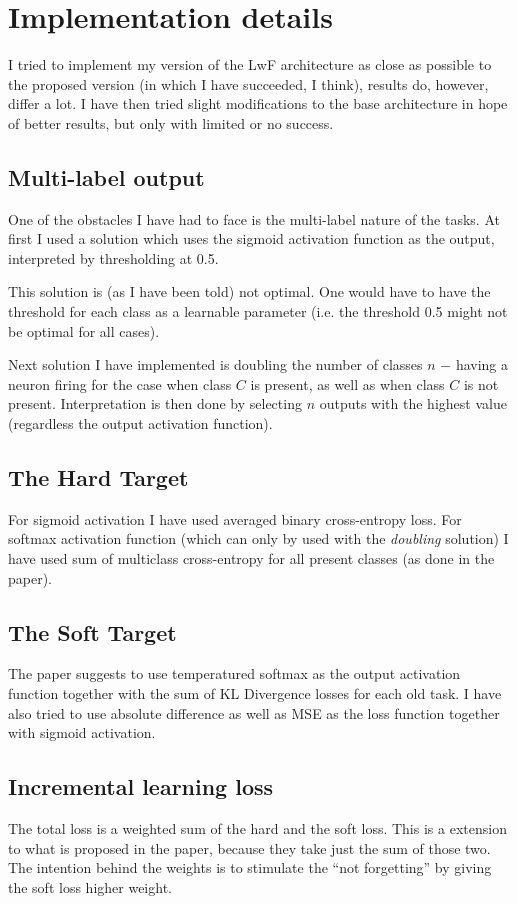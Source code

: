\documentclass[a4paper,twocolumn]{article}
\begin{document}
\section{Implementation details}
I tried to implement my version of the LwF
architecture as close as possible to the proposed version (in which I have
succeeded, I think), results do, however, differ a lot. I have then tried slight
modifications to the base architecture in hope of better results, but only with
limited or no success.

\subsection{Multi-label output}
One of the obstacles I have had to face is the multi-label nature of the tasks.
At first I used a solution which uses the sigmoid activation function as the
output, interpreted by thresholding at 0.5.

This solution is (as I have been told) not optimal. One would have to have the
threshold for each class as a learnable parameter (i.e. the threshold 0.5 might
not be optimal for all cases).

Next solution I have implemented is doubling the number of classes $n$ $-$
having a neuron firing for the case when class $C$ is present, as well as when
class $C$ is not present. Interpretation is then done by selecting $n$ outputs
with the highest value (regardless the output activation function).

\subsection{The Hard Target}
For sigmoid activation I have used averaged binary cross-entropy loss. For
softmax activation function (which can only by used with the \textit{doubling}
solution) I have used sum of multiclass cross-entropy for all present classes
(as done in the paper).

\subsection{The Soft Target}
The paper suggests to use temperatured softmax as the output activation
function together with the sum of KL Divergence losses for each old task. I have
also tried to use absolute difference as well as MSE as the loss function
together with sigmoid activation.

\subsection{Incremental learning loss}
The total loss is a weighted sum of the hard and the soft loss. This is a
extension to what is proposed in the paper, because they take just the sum of
those two. The intention behind the weights is to stimulate the ``not
forgetting'' by giving the soft loss higher weight.
\end{document}
